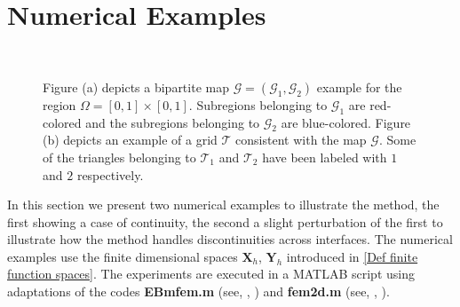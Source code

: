 \documentclass[3p]{elsarticle}
\def\X{\mathbf X}
\def\Y{\mathbf Y}
\def\triang{\mathcal{T}}
\def\tone{\mathcal{T}_{1} }%
\def\ttwo{\mathcal{T}_{2}} %
\def\map{\mathcal{G} }%
\def\mapone{\mathcal{G}_{1} }%
\def\maptwo{\mathcal{G}_{2}} %
\begin{document}
\section{Numerical Examples}\label{Sec Numerical Example}
%
%
\begin{figure}[h] %
	\centering
	\begin{subfigure}
	[Basic experimentation domain $\Omega$ and map $\map$. ]
			{\texttt{[image: ExampleDomain.pdf]} }
	\end{subfigure} %
	~ %
	\begin{subfigure}[Consistent grid example.]
			{\texttt{[image: GridExampleDomain.pdf]} } 
	\end{subfigure} %
	\caption{Figure (a) depicts a bipartite map $\map = (\mapone, \maptwo)$ example for the region $\Omega = [0,1] \times [0,1]$. Subregions belonging to $\map_{1}$ are red-colored and the subregions belonging to  $\map_{2}$ are blue-colored. 
	Figure (b) depicts an example of a grid $\triang$ consistent with the map $\map$. Some of the triangles belonging to $\tone$ and $\ttwo$ have been labeled with $1$ and $2$ respectively. \label{Fig Bipartite Map Grid Numerical Example} }
\end{figure}
%
%
In this section we present two numerical examples to illustrate the method, the first showing a case of continuity, the second a slight perturbation of the first to illustrate how the method handles discontinuities across interfaces. The numerical examples use the finite dimensional spaces $\X_{h}$, $\Y_{h}$ introduced in \eqref{Def finite function spaces}. The experiments are executed in a MATLAB script using adaptations of the codes \textbf{EBmfem.m} (see, \cite{Carstensen1}, \cite{CarstensenBahariawati}) and \textbf{fem2d.m} (see, \cite{CarstensenAlbertyFunken}, \cite{Carstensen2}).
\end{document}
